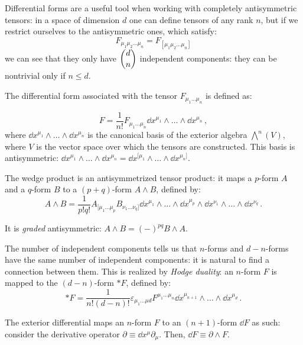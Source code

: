 \documentclass[main.tex]{subfiles}
\begin{document}
Differential forms are a useful tool when working with completely antisymmetric tensors:
in a space of dimension \(d\) one can define tensors of any rank \(n\), but if we restrict ourselves to the antisymmetric ones, which satisfy:
%
\begin{equation}
  F_{\mu_1 \mu_2 \dots \mu_{n}} 
 = F_{[\mu_1 \mu_2 \dots \mu_{n}]}
\end{equation}
%
we can see that they only have \(\dbinom{d}{n}\) independent components: they can be nontrivial only if \(n \leq d\).  

The differential form associated with the tensor \(F_{\mu_1 \dots \mu_{n}}\) is defined as:

\begin{equation}
  F = \frac{1}{n!} F_{\mu_1 \dots \mu_{n}} \dd{x^{\mu_1}} \wedge \dots \wedge \dd{x^{\mu_n}}\,,
\end{equation}
%
where \(\dd{x^{\mu_1}} \wedge \dots \wedge \dd{x^{\mu_n}}\) is the canonical basis of the exterior algebra \(\bigwedge^n (V)\), where \(V\) is the vector space over which the tensors are constructed.
This basis is antisymmetric: \(\dd{x^{\mu_1}} \wedge \dots \wedge \dd{x^{\mu_n}} = \dd{x^{[\mu_1}} \wedge \dots \wedge \dd{x^{\mu_n]}}\).

The wedge product is an antisymmetrized tensor product: it maps a \(p\)-form \(A\) and a \(q\)-form \(B\) to a \((p+q)\)-form \(A \wedge B\), defined by:
\begin{equation}
  A \wedge B = \frac{1}{p!q!} 
  A_{[\mu_1 \dots \mu_{p}} B_{\nu_1 \dots \nu_{q}]}
  \dd{x^{\mu_1}} \wedge \dots \wedge \dd{x^{\mu_p}} \wedge
  \dd{x^{\nu_1}} \wedge \dots \wedge \dd{x^{\nu_q}}\,.
\end{equation}

It is \emph{graded} antisymmetric: \(A \wedge B = (-)^{pq} B \wedge A\).

The number of independent components tells us that \(n\)-forms and \(d-n\)-forms have the same number of independent components: it is natural to find a connection between them. This is realized by \emph{Hodge duality}: an \(n\)-form \(F\) is mapped to the \((d-n)\)-form \(*F\), defined by:
\begin{equation}
  *F = 
  \frac{1}{n!(d-n)!} \varepsilon_{\mu_1 \dots \mu d} F^{\mu_1 \dots \mu_n} \dd{x^{\mu_{n+1}}} \wedge \dots \wedge \dd{x^{\mu_{d}}}\,.
\end{equation}

The exterior differential maps an \(n\)-form \(F\) to an \((n+1)\)-form \(\dd{F}\) as such:
consider the derivative operator \(\partial \equiv \dd{x^{\mu}} \partial _\mu\).
Then, \(\dd{F} \equiv \partial \wedge F\).
\end{document}

